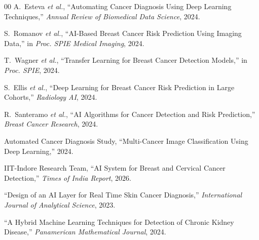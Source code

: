 \documentclass[conference]{IEEEtran}
\begin{document}
\begin{thebibliography}{00}
A.~Esteva \textit{et al.}, ``Automating Cancer Diagnosis Using Deep Learning Techniques,'' \textit{Annual Review of Biomedical Data Science}, 2024.

S.~Romanov \textit{et al.}, ``AI-Based Breast Cancer Risk Prediction Using Imaging Data,'' in \textit{Proc. SPIE Medical Imaging}, 2024.

T.~Wagner \textit{et al.}, ``Transfer Learning for Breast Cancer Detection Models,'' in \textit{Proc. SPIE}, 2024.

S.~Ellis \textit{et al.}, ``Deep Learning for Breast Cancer Risk Prediction in Large Cohorts,'' \textit{Radiology AI}, 2024.

R.~Santeramo \textit{et al.}, ``AI Algorithms for Cancer Detection and Risk Prediction,'' \textit{Breast Cancer Research}, 2024.

Automated Cancer Diagnosis Study, ``Multi-Cancer Image Classification Using Deep Learning,'' 2024.

IIT-Indore Research Team, ``AI System for Breast and Cervical Cancer Detection,'' \textit{Times of India Report}, 2026.

``Design of an AI Layer for Real Time Skin Cancer Diagnosis,'' \textit{International Journal of Analytical Science}, 2023.

``A Hybrid Machine Learning Techniques for Detection of Chronic Kidney Disease,'' \textit{Panamerican Mathematical Journal}, 2024.

\end{thebibliography}
\end{document}
